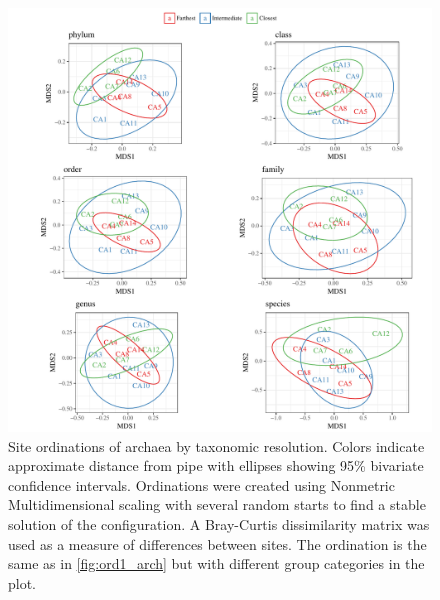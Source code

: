 \documentclass[letterpaper,12pt]{article}\usepackage[]{graphicx}\usepackage[]{color}
\newenvironment{knitrout}{}{} %
\begin{document}
\begin{knitrout}
\color{fgcolor}\begin{figure}[!ht]

{\centering \includegraphics[width=1.05\textwidth]{figs/ord2_arch-1} 

}

\caption{Site ordinations of archaea by taxonomic resolution.  Colors indicate approximate distance from pipe with ellipses showing 95\% bivariate confidence intervals. Ordinations were created using Nonmetric Multidimensional scaling with several random starts to find a stable solution of the configuration.  A Bray-Curtis dissimilarity matrix was used as a measure of differences between sites. The ordination is the same as in \cref{fig:ord1_arch} but with different group categories in the plot.}\label{fig:ord2_arch}
\end{figure}


\end{knitrout}
\clearpage
\end{document}
